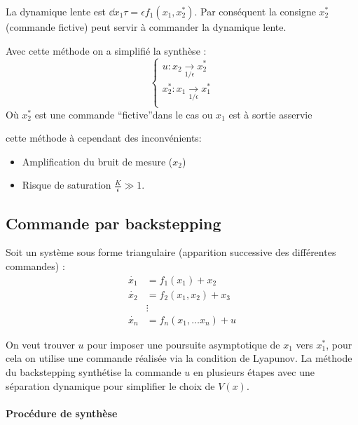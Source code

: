 \documentclass[main.tex]{subfiles}
\begin{document}
La dynamique lente est $\dd{x_1}{\tau} = \epsilon f_1(x_1,x_2^*)$. Par conséquent la consigne $x_2^*$ (commande fictive) peut servir à commander la dynamique lente.

\begin{rem}
  Avec cette méthode on a simplifié la synthèse :
  \[
    \begin{cases}
      u : x_2 \xrightarrow[1/\epsilon]{} x_2^* \\
      x_2^* : x_1 \xrightarrow[1/\epsilon]{} x_1^* \\
    \end{cases}
  \]
  Où $x_2^*$ est une commande ``fictive''dans le cas ou $x_1$ est à sortie asservie
\end{rem}
\begin{rem}
  cette méthode à cependant des inconvénients:
  \begin{itemize}
  \item Amplification du bruit de mesure ($x_2$)
  \item Risque de saturation $\frac{K}{\epsilon}\gg 1$.
  \end{itemize}
\end{rem}
\subsection{Commande par backstepping}
Soit un système sous forme triangulaire (apparition successive des différentes commandes) :
\begin{align*}
\dot{x_1} & = f_1(x_1) + x_2 \\
\dot{x_2} & = f_2(x_1,x_2) + x_3 \\
& \vdots \\
\dot{x_n} & = f_n(x_1,\dots x_n) + u 
\end{align*}


On veut trouver $u$ pour imposer une poursuite asymptotique de $x_1$ vers $x_1^*$, pour cela on utilise une commande réalisée via la condition de Lyapunov. La méthode du backstepping synthétise la commande $u$ en plusieurs étapes avec une séparation dynamique pour simplifier le choix de $V(x)$.

\paragraph{Procédure de synthèse}
\end{document}
